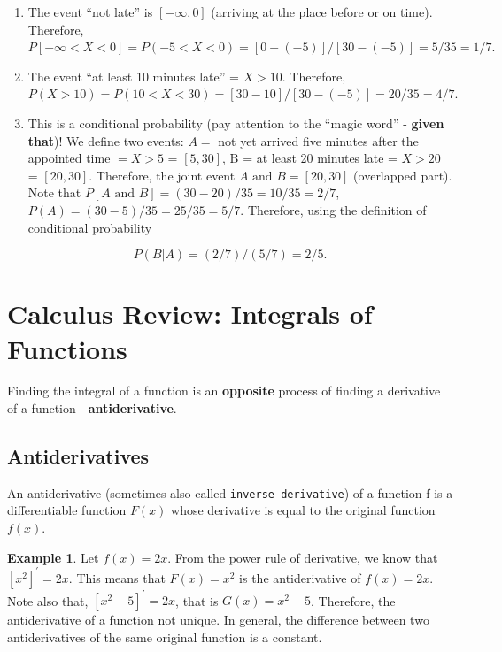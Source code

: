 \documentclass[
]{book}
\begin{document}
\begin{enumerate}
\def\labelenumi{\arabic{enumi}.}
\item
  The event ``not late'' is \([-\infty, 0]\) (arriving at the place before or on time). Therefore,
  \(P[-\infty< X <0] = P(-5 < X < 0) = [0 -(-5)]/[30 -(-5)] = 5/35 = 1/7.\)
\item
  The event ``at least 10 minutes late'' = \(X > 10\). Therefore, \(P(X > 10) = P(10 < X < 30) = [30-10]/[30-(-5)] = 20/35 = 4/7.\)
\item
  This is a conditional probability (pay attention to the ``magic word'' - \textbf{given that})! We define two events: \(A =\) not yet arrived five minutes after the appointed time \(= X > 5\) = \([5, 30]\), B = at least 20 minutes late = \(X > 20\) = \([20, 30]\). Therefore, the joint event \(A \mbox{ and } B = [20, 30]\) (overlapped part). Note that \(P[A \mbox{ and } B] = (30 - 20)/35 = 10/35 = 2/7\), \(P(A) = (30-5)/35 = 25/35 = 5/7\). Therefore, using the definition of conditional probability
\end{enumerate}

\[
P(B|A) = (2/7)/(5/7) = 2/5.
\]

\hfill\break

\hypertarget{calculus-review-integrals-of-functions}{%
\section{Calculus Review: Integrals of Functions}\label{calculus-review-integrals-of-functions}}

Finding the integral of a function is an \textbf{opposite} process of finding a derivative of a function - \textbf{antiderivative}.

\hypertarget{antiderivatives}{%
\subsection{Antiderivatives}\label{antiderivatives}}

An antiderivative (sometimes also called \texttt{inverse\ derivative}) of a function f is a differentiable function \(F(x)\) whose derivative is equal to the original function \(f(x)\).

\textbf{Example 1}. Let \(f(x) = 2x\). From the power rule of derivative, we know that \([x^2]^\prime = 2x\). This means that \(F(x) = x^2\) is the antiderivative of \(f(x) = 2x\). Note also that, \([x^2 + 5]^\prime = 2x\), that is \(G(x) = x^2 +5\). Therefore, the antiderivative of a function not unique. In general, the difference between two antiderivatives of the same original function is a constant.
\end{document}
